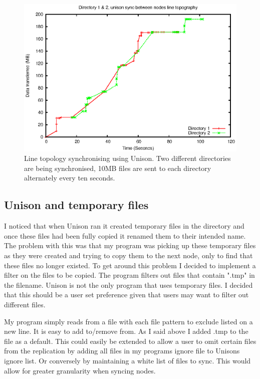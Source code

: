 \documentclass[12pt]{article}
\begin{document}
\begin{figure}[htp]
    \centering
    \includegraphics[width=1\textwidth]{images/line-uni-dir-comb.eps}
    \caption{Line topology synchronising using Unison. Two different directories are being synchronised, 10MB files are sent to each directory alternately every
    ten seconds.}
    \label{fig:line_uni_2dir_comb_graph}
\end{figure}
\newpage

\subsection{Unison and temporary files}
\label{sec:uni_and_tmp}
I noticed that when Unison ran it created temporary files in the
directory and once these files had been fully copied it renamed
them to their intended name. The problem with this was that my program
was picking up these temporary files as they were created and trying to
copy them to the next node, only to find that these files no longer existed.
To get around this problem I decided to implement a filter on the files to
be copied. The program filters out files that contain ".tmp" in the filename.
Unison is not the only program that uses temporary files. I decided that this
should be a user set preference given that users may want to filter out different
files.

My program simply reads from a file with each file pattern to exclude
listed on a new line. It is easy to add to/remove from. As I said above
I added .tmp to the file as a default. This could easily be extended
to allow a user to omit certain files from the replication by adding
all files in my programs ignore file to Unisons ignore list. Or conversely
by maintaining a white list of files to sync. This would allow for
greater granularity when syncing nodes.
\end{document}
